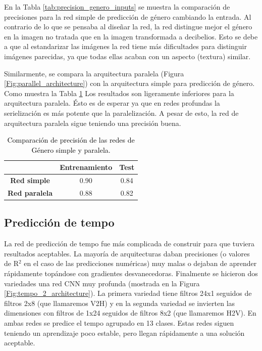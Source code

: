 En la Tabla \ref{tab:precision_genero_inputs} se muestra la comparación de precisiones para la red simple de predicción de género cambiando la entrada. Al contrario de lo que se pensaba al diseñar la red, la red distingue mejor el género en la imagen no tratada que en la imagen transformada a decibelios. Esto se debe a que al estandarizar las imágenes la red tiene más dificultades para distinguir imágenes parecidas, ya que todas ellas acaban con un aspecto (textura) similar.

Similarmente, se compara la arquitectura paralela (Figura \ref{Fig:parallel_architecture}) con la arquitectura simple para predicción de género. Como muestra la Tabla \ref{tab:precision_genero_paralelo} Los resultados son ligeramente inferiores para la arquitectura paralela. Ésto es de esperar ya que en redes profundas la serielización es más potente que la paralelización. A pesar de esto, la red de arquitectura paralela sigue teniendo una precisión buena.

\begin{table}[h]
\centering
\begin{tabular}{ccc}
\textbf{}                     & \textbf{Entrenamiento} & \textbf{Test} \\ \hline
\textbf{Red simple} & 0.90                   & 0.84          \\
\textbf{Red paralela}  & 0.88                   & 0.82          \\ \hline
\end{tabular}
\caption{\textcolor{black}{Comparación de precisión de las redes de Género simple y paralela.}}
\label{tab:precision_genero_paralelo}
\end{table}

\subsection{Predicción de tempo}\label{sec:resultados_tempo}

\noindent La red de predicción de tempo fue más complicada de construir para que tuviera resultados aceptables. La mayoría de arquitecturas daban precisiones (o valores de R$^2$ en el caso de las predicciones numéricas) muy malas o dejaban de aprender rápidamente topándose con gradientes desvanecedoras. Finalmente se hicieron dos variedades una red CNN muy profunda (mostrada en la Figura \ref{Fig:tempo_2_architecture}). La primera variedad tiene filtros 24x1 seguidos de filtros 2x8 (que llamaremos V2H) y en la segunda variedad se invierten las dimensiones con filtros de 1x24 seguidos de filtros 8x2 (que llamaremos H2V). En ambas redes se predice el tempo agrupado en 13 clases. Estas redes siguen teniendo un aprendizaje poco estable, pero llegan rápidamente a una solución aceptable.

